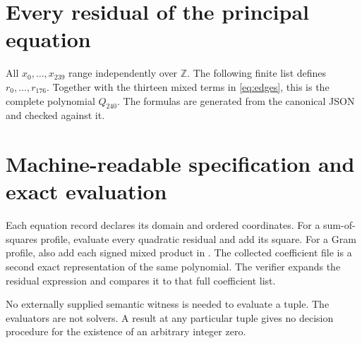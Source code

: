 \documentclass[11pt]{article}
\theoremstyle{remark}\newtheorem{remark}[theorem]{Remark}
\newcommand{\Z}{\mathbb Z}
\newcommand{\code}[1]{\texttt{\detokenize{#1}}}
\begin{document}
\appendix
\section{Every residual of the principal equation}\label{app:residuals}

All $x_0,\ldots,x_{239}$ range independently over $\Z$.
The following finite list defines $r_0,\ldots,r_{176}$.
Together with the thirteen mixed terms in \eqref{eq:edges}, this is
the complete polynomial $Q_{240}$. The formulas are generated from
the canonical JSON and checked against it.


\section{Machine-readable specification and exact evaluation}

Each equation record declares its domain and ordered coordinates.
For a sum-of-squares profile, evaluate every quadratic residual and add
its square. For a Gram profile, also add each signed mixed product in
\code{gram_cross_terms}. The collected coefficient file is a second
exact representation of the same polynomial. The verifier expands the
residual expression and compares it to that full coefficient list.

No externally supplied semantic witness is needed to evaluate a tuple.
The evaluators are not solvers. A result at any particular tuple gives
no decision procedure for the existence of an arbitrary integer zero.
\end{document}
